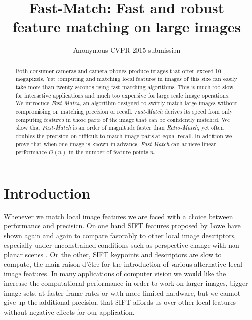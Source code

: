 \documentclass[10pt,twocolumn,letterpaper]{article}
\begin{document}

\def\ACCV14SubNumber{***}  %

\title{Fast-Match: Fast and robust feature matching on large images}

\author{Anonymous CVPR 2015 submission}

\maketitle


\begin{abstract}
    Both consumer cameras and camera phones produce images that often exceed 10 megapixels. Yet computing and matching local features in images of this size can easily take more than twenty seconds using fast matching algorithms. This is much too slow for interactive applications and much too expensive for large scale image operations. We introduce \emph{Fast-Match}, an algorithm designed to swiftly match large images without compromising on matching precision or recall. \emph{Fast-Match} derives its speed from only computing features in those parts of the image that can be confidently matched. We show that \emph{Fast-Match} is an order of magnitude faster than \emph{Ratio-Match}, yet often doubles the precision on difficult to match image pairs at equal recall. In addition we prove that when one image is known in advance, \emph{Fast-Match} can achieve linear performance $O(n)$ in the number of feature points $n$.
\end{abstract}

\section{Introduction}
%
Whenever we match local image features we are faced with a choice between performance and precision. On one hand SIFT features proposed by Lowe \cite{lowe2004sift} have shown again and again to compare favorably to other local image descriptors, especially under unconstrained conditions such as perspective change with non-planar scenes \cite{mikolajczyk2005performance,moreels2007evaluation,heinly2012comparative}. On the other, SIFT keypoints and descriptors are slow to compute, the main raison d'\^{e}tre for the introduction of various alternative local image features. In many applications of computer vision we would like the increase the computational performance in order to work on larger images, bigger image sets, at faster frame rates or with more limited hardware, but we cannot give up the additional precision that SIFT affords us over other local features without negative effects for our application.
\end{document}
